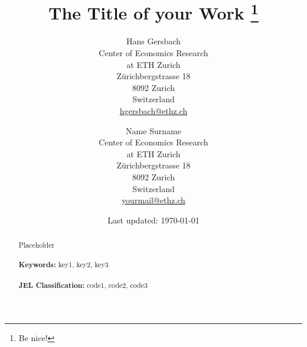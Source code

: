 \documentclass[
	12pt, %
	a4paper, %
	]{article}
\theoremstyle{break} %
\begin{document}
\begin{titlepage}
\singlespacing
\title{
	The Title of your Work
	\thanks{Be nice!}
}

\author{
	Hans Gersbach\\
	\normalsize Center of Economics Research\\
	\normalsize at ETH Zurich\\ 
	\normalsize Z\"{u}richbergstrasse 18\\
	\normalsize 8092 Zurich\\
	\normalsize Switzerland\\ 
	\normalsize \href{mailto:hgersbach@ethz.ch}{hgersbach@ethz.ch}
	\and
	Name Surname\\
	\normalsize Center of Economics Research\\
	\normalsize at ETH Zurich\\ 
	\normalsize Z\"{u}richbergstrasse 18\\
	\normalsize 8092 Zurich\\
	\normalsize Switzerland\\ 
	\normalsize \href{mailto:yourmail@ethz.ch}{yourmail@ethz.ch}
	}

\date{Last updated: \today}

\maketitle

\begin{abstract}
	\noindent Placeholder\\
	\vspace{0in}\\
	\noindent\textbf{Keywords:} key1, key2, key3\\
	\vspace{0in}\\
	\noindent\textbf{JEL Classification:} code1, code2, code3\\
	\bigskip
\end{abstract}
\thispagestyle{empty}
\end{titlepage}
\end{document}
